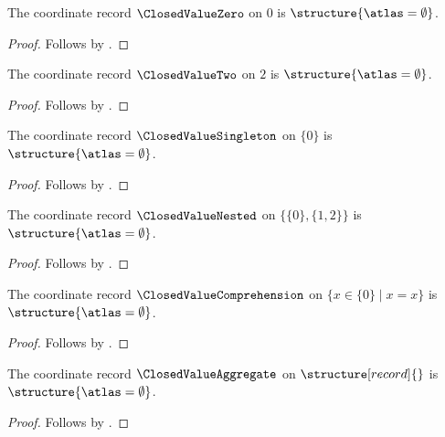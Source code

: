 

\begin{instance}\label{closed_value_zero}
    The coordinate record $\ClosedValueZero$ on $0$ is $\structure{\atlas=\emptyset}$.
\end{instance}
\begin{proof}
    Follows by .
\end{proof}

\begin{instance}\label{closed_value_two}
    The coordinate record $\ClosedValueTwo$ on $2$ is $\structure{\atlas=\emptyset}$.
\end{instance}
\begin{proof}
    Follows by .
\end{proof}

\begin{instance}\label{closed_value_singleton}
    The coordinate record $\ClosedValueSingleton$ on $\{0\}$ is $\structure{\atlas=\emptyset}$.
\end{instance}
\begin{proof}
    Follows by .
\end{proof}

\begin{instance}\label{closed_value_nested}
    The coordinate record $\ClosedValueNested$ on $\{\{0\},\{1,2\}\}$ is $\structure{\atlas=\emptyset}$.
\end{instance}
\begin{proof}
    Follows by .
\end{proof}

\begin{instance}\label{closed_value_comprehension}
    The coordinate record $\ClosedValueComprehension$ on $\{x\in\{0\}\mid x=x\}$ is $\structure{\atlas=\emptyset}$.
\end{instance}
\begin{proof}
    Follows by .
\end{proof}

\begin{instance}\label{closed_value_aggregate}
    The coordinate record $\ClosedValueAggregate$ on $\structure[record]{}$ is $\structure{\atlas=\emptyset}$.
\end{instance}
\begin{proof}
    Follows by .
\end{proof}

